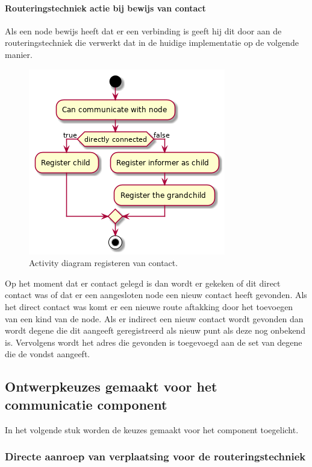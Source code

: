 \documentclass[a4paper, 11pt, oneside]{report}
\begin{document}
\paragraph{Routeringstechniek actie bij bewijs van contact}
\label{DetailedDesign:Communicatie:Activity:routeringtechniek:contactgevonden}
Als een node bewijs heeft dat er een verbinding is geeft hij dit door aan de routeringstechniek die verwerkt dat in de huidige implementatie op de volgende manier.

\begin{figure}[H]
	\begin{center}\includegraphics[width=.45\linewidth]{UML/out/Communication/activity/contactgevonden/contactgevonden.png}\end{center}
	\caption{Activity diagram registeren van contact.}
	\label{fig:communication:routeringtechniek:gevonde}
\end{figure}

Op het moment dat er contact gelegd is dan wordt er gekeken of dit direct contact was of dat er een aangesloten node een nieuw contact heeft gevonden. Als het direct contact was komt er een nieuwe route aftakking door het toevoegen van een kind van de node.
Als er indirect een nieuw contact wordt gevonden dan wordt degene die dit aangeeft geregistreerd als nieuw punt als deze nog onbekend is. Vervolgens wordt het adres die gevonden is toegevoegd aan de set van degene die de vondst aangeeft.

\subsection{Ontwerpkeuzes gemaakt voor het communicatie component}
\label{DetailedDesign:Communicatie:ontwerkeuzes}
In het volgende stuk worden de keuzes gemaakt voor het component toegelicht.

\subsubsection{Directe aanroep van verplaatsing voor de routeringstechniek}
\end{document}
